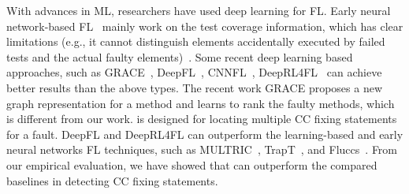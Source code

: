 With advances in ML, researchers have used deep learning
for FL. Early neural network-based FL~\cite{zheng2016fault,
  briand2007using, zhang2017deep, wong2009bp} mainly work on the test
coverage information, which has clear limitations (e.g., it cannot
distinguish elements accidentally executed by failed tests and the
actual faulty elements)~\cite{TraPT}.
%
Some recent deep learning based approaches, such as
GRACE~\cite{lou2021boosting}, DeepFL~\cite{DeepFL},
CNNFL~\cite{zhang2019cnn}, DeepRL4FL~\cite{icse21-fl} can achieve
better results than the above types. The recent work GRACE proposes a
new graph representation for a method and learns to rank the faulty
methods, which is different from our work. {\tool} is designed for
locating multiple CC fixing statements for a fault. DeepFL and
DeepRL4FL can outperform the learning-based and early neural networks
FL techniques, such as MULTRIC~\cite{MULTRIC}, TrapT~\cite{TraPT}, and
Fluccs~\cite{sohn2017fluccs}. From our empirical evaluation, we have
showed that {\tool} can outperform the compared baselines in detecting
CC fixing statements.














\iffalse

